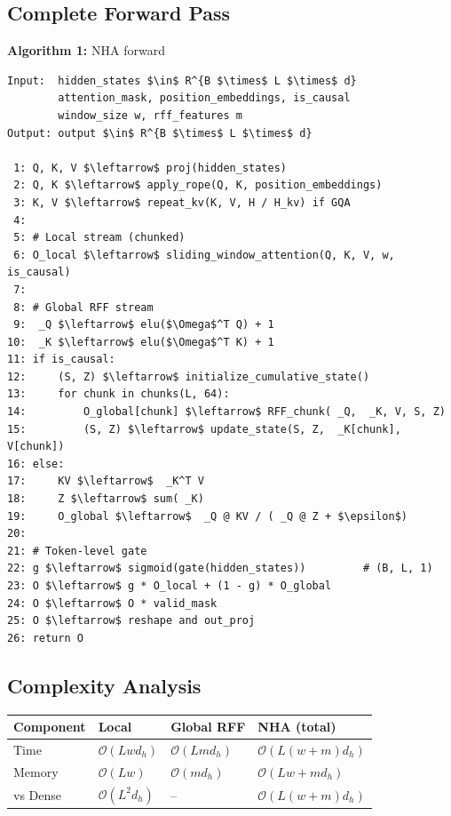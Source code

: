 \subsection{Complete Forward Pass}

\textbf{Algorithm 1:} NHA forward
\begin{lstlisting}
Input:  hidden_states $\in$ R^{B $\times$ L $\times$ d}
        attention_mask, position_embeddings, is_causal
        window_size w, rff_features m
Output: output $\in$ R^{B $\times$ L $\times$ d}

 1: Q, K, V $\leftarrow$ proj(hidden_states)
 2: Q, K $\leftarrow$ apply_rope(Q, K, position_embeddings)
 3: K, V $\leftarrow$ repeat_kv(K, V, H / H_kv) if GQA
 4:
 5: # Local stream (chunked)
 6: O_local $\leftarrow$ sliding_window_attention(Q, K, V, w, is_causal)
 7:
 8: # Global RFF stream
 9:  _Q $\leftarrow$ elu($\Omega$^T Q) + 1
10:  _K $\leftarrow$ elu($\Omega$^T K) + 1
11: if is_causal:
12:     (S, Z) $\leftarrow$ initialize_cumulative_state()
13:     for chunk in chunks(L, 64):
14:         O_global[chunk] $\leftarrow$ RFF_chunk( _Q,  _K, V, S, Z)
15:         (S, Z) $\leftarrow$ update_state(S, Z,  _K[chunk], V[chunk])
16: else:
17:     KV $\leftarrow$  _K^T V
18:     Z $\leftarrow$ sum( _K)
19:     O_global $\leftarrow$  _Q @ KV / ( _Q @ Z + $\epsilon$)
20:
21: # Token-level gate
22: g $\leftarrow$ sigmoid(gate(hidden_states))         # (B, L, 1)
23: O $\leftarrow$ g * O_local + (1 - g) * O_global
24: O $\leftarrow$ O * valid_mask
25: O $\leftarrow$ reshape and out_proj
26: return O
\end{lstlisting}

\subsection{Complexity Analysis}

\begin{table}[H]
\centering
\small
\begin{tabular}{llll}
\toprule
\textbf{Component} & \textbf{Local} & \textbf{Global RFF} & \textbf{NHA (total)} \\
\midrule
Time & $\mathcal{O}(L w d_h)$ & $\mathcal{O}(L m d_h)$ & $\mathcal{O}(L (w + m) d_h)$ \\
Memory & $\mathcal{O}(L w)$ & $\mathcal{O}(m d_h)$ & $\mathcal{O}(L w + m d_h)$ \\
vs Dense & $\mathcal{O}(L^2 d_h)$ & -- & \textbf{$\mathcal{O}(L (w + m) d_h)$} \\
\bottomrule
\end{tabular}
\end{table}


